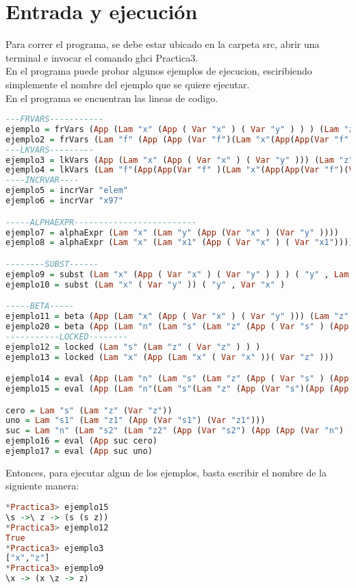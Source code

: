 \documentclass{article}
\begin{document}
\section{Entrada y ejecución}

Para correr el programa, se debe estar ubicado en la carpeta src, abrir una terminal e invocar el comando ghci Practica3.\\
En el programa puede probar algunos ejemplos de ejecucion, esciribiendo simplemente el nombre del ejemplo que se quiere ejecutar.\\
En el programa se encuentran las lineas de codigo.

\begin{lstlisting}[language=Haskell]
---FRVARS-----------
ejemplo = frVars (App (Lam "x" (App ( Var "x" ) ( Var "y" ) ) ) (Lam "z" ( Var "z" ) ) )
ejemplo2 = frVars (Lam "f" (App (App (Var "f")(Lam "x"(App(App(Var "f")(Var "x"))(Var "x" ))))(Lam "x"(App(App(Var "f")(Var "x" ))( Var "x")))))
---LKVARS---------
ejemplo3 = lkVars (App (Lam "x" (App ( Var "x" ) ( Var "y" ))) (Lam "z" ( Var "z" )))
ejemplo4 = lkVars (Lam "f"(App(App(Var "f" )(Lam "x"(App(App(Var "f")(Var "x" ))(Var "x" ))))(Lam "x" (App(App(Var "f" )(Var "x"))(Var "x" )))))
----INCRVAR----
ejemplo5 = incrVar "elem"
ejemplo6 = incrVar "x97"

-----ALPHAEXPR-------------------------
ejemplo7 = alphaExpr (Lam "x" (Lam "y" (App (Var "x" ) (Var "y" ))))
ejemplo8 = alphaExpr (Lam "x" (Lam "x1" (App ( Var "x" ) ( Var "x1"))))

--------SUBST------
ejemplo9 = subst (Lam "x" (App ( Var "x" ) ( Var "y" ) ) ) ( "y" , Lam "z" ( Var "z" ))
ejemplo10 = subst (Lam "x" ( Var "y" )) ( "y" , Var "x" )

-----BETA-----
ejemplo11 = beta (App (Lam "x" (App ( Var "x" ) ( Var "y" ))) (Lam "z" ( Var "z" )))
ejemplo20 = beta (App (Lam "n" (Lam "s" (Lam "z" (App ( Var "s" ) (App (App ( Var "n" ) ( Var "s" ) ) ( Var "z" ) ) ) ) ) ) (Lam "s" (Lam "z" ( Var "z" ) ) ) )
-----------LOCKED--------
ejemplo12 = locked (Lam "s" (Lam "z" ( Var "z" ) ) )
ejemplo13 = locked (Lam "x" (App (Lam "x" ( Var "x" ))( Var "z" )))

ejemplo14 = eval (App (Lam "n" (Lam "s" (Lam "z" (App ( Var "s" ) (App (App ( Var "n" ) ( Var "s" ) ) ( Var "z" ) ) ) ) ) ) (Lam "s" (Lam "z" ( Var "z" ) ) ) )
ejemplo15 = eval (App (Lam "n"(Lam "s"(Lam "z" (App (Var "s")(App (App (Var "n")(Var "s"))(Var "z" ))))))(Lam "s" (Lam "z" (App ( Var "s" )(Var "z" )))))

cero = Lam "s" (Lam "z" (Var "z"))
uno = Lam "s1" (Lam "z1" (App (Var "s1") (Var "z1")))
suc = Lam "n" (Lam "s2" (Lam "z2" (App (Var "s2") (App (App (Var "n") (Var "s2")) (Var "z2")))))
ejemplo16 = eval (App suc cero)
ejemplo17 = eval (App suc uno)
\end{lstlisting}
Entonces, para ejecutar algun de los ejemplos, basta escribir el nombre de la siguiente manera:
\begin{lstlisting}[language=Haskell]
*Practica3> ejemplo15
\s ->\ z -> (s (s z))
*Practica3> ejemplo12
True
*Practica3> ejemplo3
["x","z"]
*Practica3> ejemplo9
\x -> (x \z -> z)
\end{lstlisting}
\end{document}
